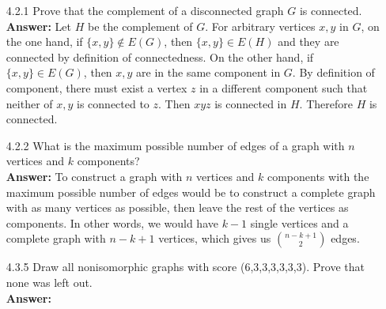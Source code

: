 \documentclass{article}
\begin{document}
\begin{itemize}
    \item [4.2.1] Prove that the complement of a disconnected graph $G$ is connected.\\\textbf{Answer: } Let $H$ be the complement of $G$. For arbitrary vertices $x,y$ in $G$, on the one hand, if $\{x,y\}\notin E(G)$, then $\{x,y\}\in E(H)$ and they are connected by definition of connectedness. On the other hand, if $\{x,y\}\in E(G)$, then $x,y$ are in the same component in $G$. By definition of component, there must exist a vertex $z$ in a different component such that neither of $x,y$ is connected to $z$. Then $xyz$ is connected in $H$. Therefore $H$ is connected.
    \item [4.2.2] What is the maximum possible number of edges of a graph with $n$ vertices and $k$ components?\\
          \textbf{Answer: } To construct a graph with $n$ vertices and $k$ components with the maximum possible number of edges would be to construct a complete graph with as many vertices as possible, then leave the rest of the vertices as components. In other words, we would have $k-1$ single vertices and a complete graph with $n-k+1$ vertices, which gives us $n-k+1\choose 2$ edges.
    \item [4.3.5] Draw all nonisomorphic graphs with score (6,3,3,3,3,3,3). Prove that none was left out.\\\textbf{Answer: }\\
          \hspace{30px}
\end{itemize}
\end{document}
